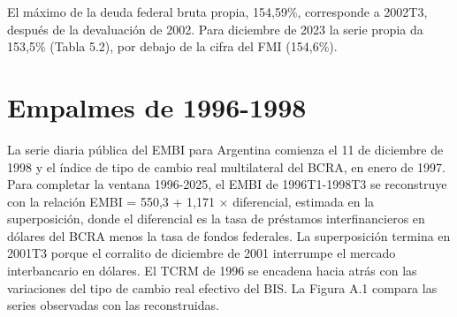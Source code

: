 El máximo de la deuda federal bruta propia, 154,59\%, corresponde a
2002T3, después de la devaluación de 2002. Para diciembre de 2023 la
serie propia da 153,5\% (Tabla 5.2), por debajo de la cifra del FMI
(154,6\%).

\section{Empalmes de 1996-1998}

La serie diaria pública del EMBI para Argentina comienza el 11 de
diciembre de 1998 y el índice de tipo de cambio real multilateral del
BCRA, en enero de 1997. Para completar la ventana 1996-2025, el EMBI de
1996T1-1998T3 se reconstruye con la relación EMBI = 550,3 + 1,171 ×
diferencial, estimada en la superposición, donde el diferencial es la
tasa de préstamos interfinancieros en dólares del BCRA menos la tasa de
fondos federales. La superposición termina en 2001T3 porque el corralito
de diciembre de 2001 interrumpe el mercado interbancario en dólares. El
TCRM de 1996 se encadena hacia atrás con las variaciones del tipo de
cambio real efectivo del BIS. La Figura A.1 compara las series
observadas con las reconstruidas.

